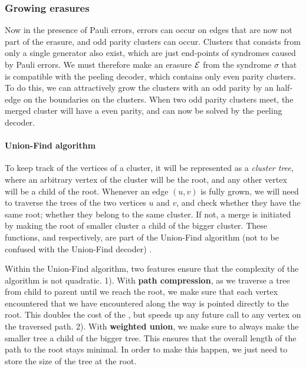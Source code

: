 \subsubsection{Growing erasures}
Now in the presence of Pauli errors, errors can occur on edges that are now not part of the erasure, and odd parity clusters can occur. Clusters that consists from only a single generator also exist, which are just end-points of syndromes caused by Pauli errors. We must therefore make an erasure $\mathcal{E}$ from the syndrome $\sigma$ that is compatible with the peeling decoder, which contains only even parity clusters. To do this, we can attractively grow the clusters with an odd parity by an half-edge on the boundaries on the clusters. When two odd parity clusters meet, the merged cluster will have a even parity, and can now be solved by the peeling decoder.

\paragraph{Union-Find algorithm}


To keep track of the vertices of a cluster, it will be represented as a \emph{cluster tree}, where an arbitrary vertex of the cluster will be the root, and any other vertex will be a child of the root. Whenever an edge $(u,v)$ is fully grown, we will need to traverse the trees of the two vertices $u$ and $v$, and check whether they have the same root; whether they belong to the same cluster. If not, a merge is initiated by making the root of smaller cluster a child of the bigger cluster. These functions,  and  respectively, are part of the Union-Find algorithm (not to be confused with the Union-Find decoder) \cite{tarjan1975efficiency}.



Within the Union-Find algorithm, two features ensure that the complexity of the algorithm is not quadratic. 1). With \textbf{path compression}, as we traverse a tree from child to parent until we reach the root, we make sure that each vertex encountered that we have encountered along the way is pointed directly to the root. This doubles the cost of the , but speeds up any future call to any vertex on the traversed path. 2). With \textbf{weighted union}, we make sure to always make the smaller tree a child of the bigger tree. This ensures that the overall length of the path to the root stays minimal. In order to make this happen, we just need to store the size of the tree at the root.

